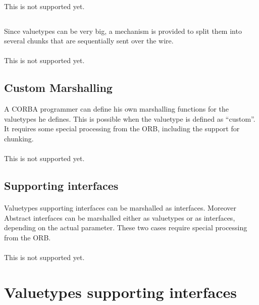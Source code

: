\paragraph{}This is not supported yet.

\subsection{}Since valuetypes can be very big, a mechanism is provided
to split them into several chunks that are sequentially sent over the
wire.

\paragraph{}This is not supported yet.

\subsection{Custom Marshalling}A CORBA programmer can define his own
marshalling functions for the valuetypes he defines. This is possible
when the valuetype is defined as ``custom''. It requires some
special processing from the ORB, including the support for chunking.

\paragraph{}This is not supported yet.

\subsection{Supporting interfaces}
\paragraph{}Valuetypes supporting interfaces can be marshalled as
interfaces. Moreover Abstract interfaces can be marshalled either as
valuetypes or as interfaces, depending on the actual parameter. These
two cases require special processing from the ORB.

\paragraph{}This is not supported yet.

\section{Valuetypes supporting interfaces}

